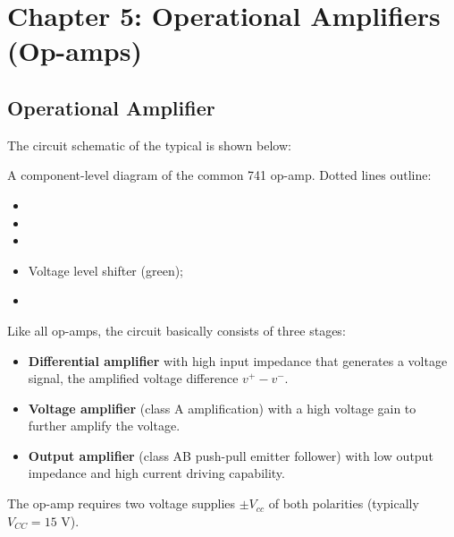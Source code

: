 \usepackage{html}


\section*{Chapter 5: Operational Amplifiers (Op-amps)}

\subsection*{Operational Amplifier}

The circuit schematic of the typical 
 is shown below:



A component-level diagram of the common 741 op-amp. Dotted lines outline: 
\begin{itemize}
\item {}
\item {}
\item {}
\item Voltage level shifter (green); 
\item {}
\end{itemize}


Like all op-amps, the circuit basically consists of three stages:
\begin{itemize}
\item {\bf Differential amplifier} with high input impedance that generates
  a voltage signal, the amplified voltage difference $v^+-v^-$.
\item {\bf Voltage amplifier} (class A amplification) with a high voltage gain 
  to further amplify the voltage.
\item {\bf Output amplifier} (class AB push-pull emitter follower) with low 
  output impedance and high current driving capability.
\end{itemize}
The op-amp requires two voltage supplies $\pm V_{cc}$ of both polarities (typically 
$V_{CC}=15$ V). 

